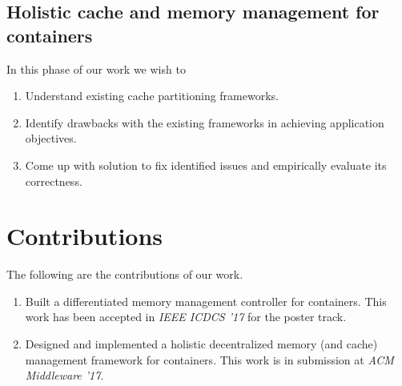    \subsection{Holistic cache and memory management for containers}
      In this phase of our work we wish to
      \begin{enumerate}
	\item Understand existing cache partitioning frameworks.
	\item Identify drawbacks with the existing frameworks in achieving application objectives.
	\item Come up with solution to fix identified issues and empirically evaluate its correctness.
      \end{enumerate}

  \section{Contributions}
    The following are the contributions of our work.  
      \begin{enumerate}
	\item Built a differentiated memory management controller for containers. This work has been 
	accepted in \textit{IEEE ICDCS '17} for the poster track.
	\item Designed and implemented a holistic decentralized memory (and cache) management framework for containers. This work 
	is in submission at \textit{ACM Middleware '17}.
      \end{enumerate}

  